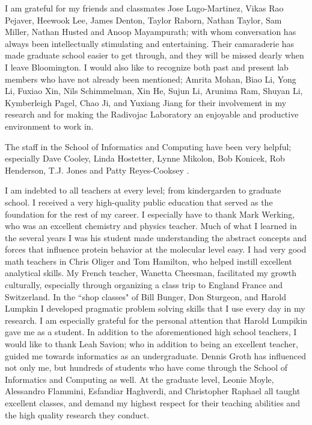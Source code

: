 \begin{acknowledgements}
I am grateful for my friends and classmates Jose Lugo-Martinez, Vikas Rao Pejaver, Heewook Lee, James Denton, Taylor Raborn, Nathan Taylor, Sam Miller, Nathan Husted and Anoop Mayampurath; with whom conversation has always been intellectually stimulating and entertaining. Their camaraderie has made graduate school easier to get through, and they will be missed dearly when I leave Bloomington.  I would also like to recognize both past and present lab members who have not already been mentioned; Amrita Mohan, Biao Li, Yong Li, Fuxiao Xin, Nils Schimmelman, Xin He, Sujun Li, Arunima Ram, Shuyan Li, Kymberleigh Pagel, Chao Ji, and Yuxiang Jiang for their involvement in my research and for making the Radivojac Laboratory an enjoyable and productive environment to work in.

The staff in the School of Informatics and Computing have been very helpful; especially Dave Cooley, Linda Hostetter, Lynne Mikolon, Bob Konicek, Rob Henderson, T.J. Jones and Patty Reyes-Cooksey .  

I am indebted to all teachers at every level; from kindergarden to graduate school. I received a very high-quality public education that served as the foundation for the rest of my career. I especially have to thank Mark Werking, who was an excellent chemistry and physics teacher.  Much of what I learned in the several years I was his student made understanding the abstract concepts and forces that influence protein behavior at the molecular level easy.  I had very good math teachers in Chris Oliger and Tom Hamilton, who helped instill excellent analytical skills.  My French teacher, Wanetta Cheesman, facilitated my growth culturally, especially through organizing a class trip to England France and Switzerland. In the ``shop classes" of Bill Bunger, Don Sturgeon, and Harold Lumpkin I developed pragmatic problem solving skills that I use every day in my research.  I am especially grateful for the personal attention that Harold Lumpikin gave me as a student. In addition to the aforementioned high school teachers, I would like to thank Leah Savion; who in addition to being an excellent teacher, guided me towards informatics as an undergraduate.  Dennis Groth has influenced not only me, but hundreds of students who have come through the School of Informatics and Computing as well.  At the graduate level, Leonie Moyle, Alessandro Flammini, Esfandiar Haghverdi, and Christopher Raphael all taught excellent classes, and demand my highest respect for their teaching abilities and the high quality research they conduct.


\end{acknowledgements}
